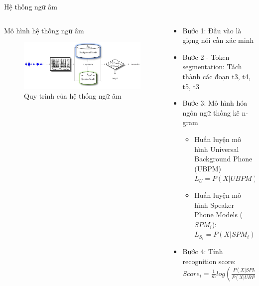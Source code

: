 \documentclass[notheorems, aspectratio=54]{beamer}
\begin{document}
\begin{frame}{Hệ thống ngữ âm}
	\begin{columns}
		\begin{column}{0.5\textwidth}
			Mô hình hệ thống ngữ âm
			\begin{figure}[H]
				\centering
				\includegraphics[width=1\linewidth]{images/diagram.png}
				\caption{Quy trình của hệ thống ngữ âm}
				\label{fig:writing-thesis}
			\end{figure}
		\end{column}
		\begin{column}{0.5\textwidth}
			\begin{itemize}
				\item Bước 1: Đầu vào là giọng nói cần xác minh
				\item Bước 2 - Token segmentation: Tách thành các đoạn t3, t4, t5, t3
				\item Bước 3: Mô hình hóa ngôn ngữ thống kê n-gram
				\begin{itemize}
					\item Huấn luyện mô hình Universal Background Phone (UBPM) $L_{U} = P(X|UBPM)$
					\item Huấn luyện mô hình Speaker Phone Models ($SPM_{i}$): $L_{S_{i}} = P(X | SPM_{i})$
				\end{itemize}
				\item Bước 4: Tính recognition score: $Score_{i} = \frac{1}{m}log\left(\frac{P(X | SPM_{i})}{P(X|UBPM)}\right)$
			\end{itemize}
		\end{column}
	\end{columns}
\end{frame}	
\end{document}
